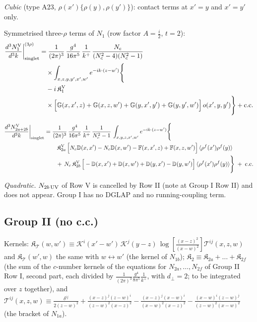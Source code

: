 \documentclass[9pt]{article}
\def\mf#1{\mathbb{#1}}
\numberwithin{equation}{section}
\begin{document}
{\emph{Cubic} (type A23, $\rho(x')\{\rho(y),\rho(y')\}$): contact terms at $x'=y$ and $x'=y'$ only.

 Symmetrised three-$\rho$ terms of $N_{1}$ (row factor $A=\frac{i}{2}$, $t=2$):
\begin{align}
\frac{d^{3}N_{1}^{\rm V}}{d^{3}k}\bigg|^{(3\rho)}_{\rm singlet}&=\frac{1}{(2\pi)^{3}}\,\frac{g^{4}}{16\pi^{5}}\,\frac{1}{k^{+}}\,\frac{N_{c}}{(N_{c}^{2}-4)(N_{c}^{2}-1)}\notag\\
&\quad\times\int_{x,z,y,y',x',w'}e^{-ik\cdot(z-w')}\Bigg\{\notag\\
&\quad-i\,\mathfrak{K}^{\rm V}_{1}\notag\\
&\quad\times\Big[\mf{G}(x,x',z)+\mf{G}(x,z,w')+\mf{G}(y,x',y')+\mf{G}(y,y',w')\Big]\,o(x',y,y')\Bigg\}+{\rm c.c.}\label{eq:s-o-I-V-1}
\end{align}

\begin{align}
\frac{d^{3}N_{2a+2b}^{\rm V}}{d^{3}k}\bigg|_{\rm singlet}&=\frac{1}{(2\pi)^{3}}\,\frac{g^{4}}{16\pi^{5}}\,\frac{1}{k^{+}}\,\frac{1}{N_{c}^{2}-1}\,\int_{x,y,z,x',w'}e^{-ik\cdot(z-w')}\Bigg\{\notag\\
&\qquad \,\mathfrak{K}^{\rm V}_{2a}\,\Big[N_{c}\mf{D}(x,x')-N_{c}\mf{D}(x,w')-\mf{F}(x,x',z)+\mf{F}(x,z,w')\Big]\,\langle\rho^{f}(x')\rho^{f}(y)\rangle\notag\\
&\qquad +\,N_{c}\,\mathfrak{K}^{\rm V}_{2b}\,\Big[-\mf{D}(x,x')+\mf{D}(x,w')+\mf{D}(y,x')-\mf{D}(y,w')\Big]\,\langle\rho^{f}(x')\rho^{f}(y)\rangle\Bigg\}\;+\;{\rm c.c.}\label{eq:s-I-V-2}
\end{align}

\emph{Quadratic.} $N_{2b\,\rm UV}$ of Row V is cancelled by Row II (note at Group I Row II) and does not appear. Group I has no DGLAP and no running-coupling term.

\subsection{Group II (no c.c.)}
\noindent Kernels: $\mathfrak{K}_{\mathcal{T}}(w,w')\equiv\mathcal{K}^{i}(x'-w')\,\mathcal{K}^{j}(y-z)\,\log\left[\frac{(x-z)^{2}}{(x-w)^{2}}\right]\mathcal{T}^{ij}(x,z,w)$ and $\mathfrak{K}_{\mathcal{T}}(w',w)$ the same with $w\leftrightarrow w'$ (the kernel of $N_{1b}$); $\mathfrak{K}_{2}\equiv\mathfrak{K}_{2a}+\dots+\mathfrak{K}_{2f}$ (the sum of the $c$-number kernels of the equations for $N_{2a},\dots,N_{2f}$ of Group II Row I, second part, each divided by $\frac{1}{(2\pi)^{3}}\frac{g^{4}}{8\pi^{5}}\frac{1}{k^{+}}$, with $d_{\perp}=2$; to be integrated over $z$ together), and $\mathcal{T}^{ij}(x,z,w)\equiv\frac{\delta^{ij}}{2(z-w)^{2}}+\frac{(x-z)^{j}(z-w)^{i}}{(z-w)^{2}(x-z)^{2}}-\frac{(x-z)^{j}(x-w)^{i}}{(x-w)^{2}(x-z)^{2}}-\frac{(x-w)^{i}(z-w)^{j}}{(z-w)^{2}(x-w)^{2}}$ (the bracket of $N_{1a}$).
}
\end{document}
